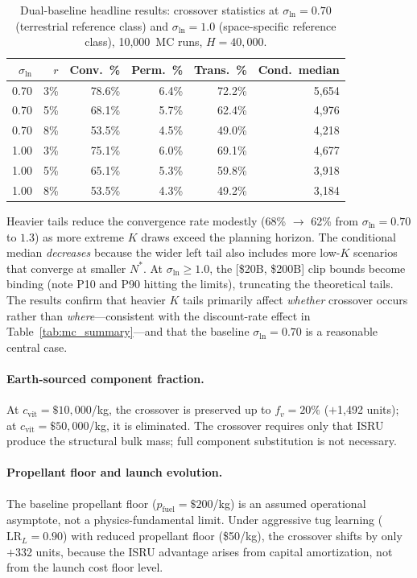 \documentclass[preprint,12pt]{elsarticle}
\begin{document}
\begin{table}[htbp]
\centering
\caption{Dual-baseline headline results: crossover statistics at $\sigma_{\ln} = 0.70$ (terrestrial reference class) and $\sigma_{\ln} = 1.0$ (space-specific reference class), 10{,}000~MC runs, $H = 40{,}000$.}
\label{tab:dual_baseline}
\small
\begin{tabular}{@{}rrrrrr@{}}
\toprule
$\sigma_{\ln}$ & $r$ & Conv.\ \% & Perm.\ \% & Trans.\ \% & Cond.\ median \\
\midrule
0.70 & 3\%  & 78.6\% & 6.4\%  & 72.2\% & 5{,}654 \\
0.70 & 5\%  & 68.1\% & 5.7\%  & 62.4\% & 4{,}976 \\
0.70 & 8\%  & 53.5\% & 4.5\%  & 49.0\% & 4{,}218 \\
\midrule
1.00 & 3\%  & 75.1\% & 6.0\%  & 69.1\% & 4{,}677 \\
1.00 & 5\%  & 65.1\% & 5.3\%  & 59.8\% & 3{,}918 \\
1.00 & 8\%  & 53.5\% & 4.3\%  & 49.2\% & 3{,}184 \\
\bottomrule
\end{tabular}
\end{table}

Heavier tails reduce the convergence rate modestly (68\% $\to$ 62\% from $\sigma_{\ln} = 0.70$ to $1.3$) as more extreme $K$ draws exceed the planning horizon. The conditional median \emph{decreases} because the wider left tail also includes more low-$K$ scenarios that converge at smaller $N^*$. At $\sigma_{\ln} \geq 1.0$, the [\$20B, \$200B] clip bounds become binding (note P10 and P90 hitting the limits), truncating the theoretical tails. The results confirm that heavier $K$ tails primarily affect \emph{whether} crossover occurs rather than \emph{where}---consistent with the discount-rate effect in Table~\ref{tab:mc_summary}---and that the baseline $\sigma_{\ln} = 0.70$ is a reasonable central case.

\paragraph{Earth-sourced component fraction.} At $c_{\mathrm{vit}} = \$10{,}000$/kg, the crossover is preserved up to $f_v = 20\%$ ($+$1{,}492 units); at $c_{\mathrm{vit}} = \$50{,}000$/kg, it is eliminated. The crossover requires only that ISRU produce the structural bulk mass; full component substitution is not necessary.

\paragraph{Propellant floor and launch evolution.} The baseline propellant floor ($p_{\mathrm{fuel}} = \$200$/kg) is an assumed operational asymptote, not a physics-fundamental limit. Under aggressive tug learning ($\mathrm{LR}_L = 0.90$) with reduced propellant floor (\$50/kg), the crossover shifts by only $+$332 units, because the ISRU advantage arises from capital amortization, not from the launch cost floor level.
\end{document}
